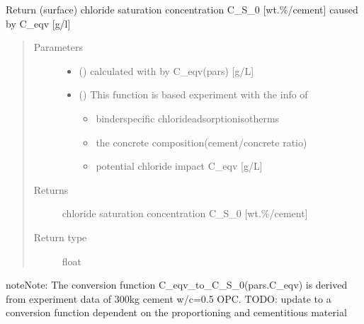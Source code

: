 \documentclass[letterpaper,10pt,english]{sphinxmanual}
\begin{document}
\begin{fulllineitems}
\label{\detokenize{chloride:chloride.C_S_0}}
\sphinxAtStartPar
Return (surface) chloride saturation concentration C\_S\_0 {[}wt.\sphinxhyphen{}\%/cement{]} caused by  C\_eqv {[}g/l{]}
\begin{quote}\begin{description}
\item[{Parameters}] \leavevmode\begin{itemize}
\item {} 
\sphinxAtStartPar
{} () \textendash{} calculated with by C\_eqv(pars) {[}g/L{]}

\item {} 
\sphinxAtStartPar
{} () \textendash{} 
\sphinxAtStartPar
This function is based experiment with the info of
\begin{itemize}
\item {} 
\sphinxAtStartPar
binder\sphinxhyphen{}specific chloride\sphinxhyphen{}adsorption\sphinxhyphen{}isotherms

\item {} 
\sphinxAtStartPar
the concrete composition(cement/concrete ratio)

\item {} 
\sphinxAtStartPar
potential chloride impact C\_eqv {[}g/L{]}

\end{itemize}


\end{itemize}

\item[{Returns}] \leavevmode
\sphinxAtStartPar
chloride saturation concentration C\_S\_0 {[}wt.\sphinxhyphen{}\%/cement{]}

\item[{Return type}] \leavevmode
\sphinxAtStartPar
float

\end{description}\end{quote}

\begin{sphinxadmonition}{note}{Note:}
\sphinxAtStartPar
The conversion function C\_eqv\_to\_C\_S\_0(pars.C\_eqv) is derived from experiment data of 300kg cement w/c=0.5 OPC.
TODO: update to a conversion function dependent on the proportioning and cementitious material
\end{sphinxadmonition}

\end{fulllineitems}
\end{document}
